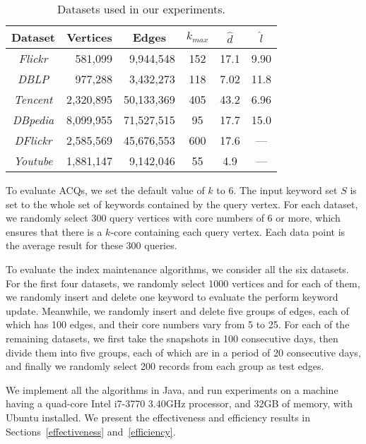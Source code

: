 \begin{table}[h]
  \centering
  \small
  \footnotesize \caption {Datasets used in our experiments.}\label{tab:dataset}
  \begin{tabular}{c|r|r|c|c|c}
     \hline
          {\bf Dataset}  & \multicolumn{1}{c|}{\textbf{Vertices}}
                         & \multicolumn{1}{c|}{\textbf{Edges}}
                         & $k_{max}$
                         & \textbf{\emph{{$\widehat d$}}}
                         & \textbf{\emph{{$\widehat l$}}}\\
     \hline\hline
          \emph{Flickr}         &  581,099      &  9,944,548   &   152   & 17.1   &  9.90 \\
     \hline
          \emph{DBLP}           &  977,288      &  3,432,273   &   118   &  7.02  &  11.8 \\
     \hline
          \emph{Tencent}        &  2,320,895    &  50,133,369  &   405   &  43.2  &  6.96 \\
     \hline
          \emph{DBpedia}        &  8,099,955    &  71,527,515  &    95   &  17.7  &  15.0 \\
     \hline
          \emph{DFlickr}        &  2,585,569    &  45,676,553  &   600   &  17.6  &  --- \\
     \hline
          \emph{Youtube}        &  1,881,147    &  9,142,046   &   55   &  4.9  &  --- \\
     \hline
  \end{tabular}
\end{table}

{\color{blue}
To evaluate ACQs, we set the default value of $k$ to 6. The input keyword set $S$ is set to the whole set of keywords contained by the query vertex. For each dataset, we randomly select 300 query vertices with core numbers of 6 or more, which ensures that there is a $k$-core containing each query vertex.
Each data point is the average result for these 300 queries.

To evaluate the index maintenance algorithms, we consider all the six datasets.
For the first four datasets, we randomly select 1000 vertices and for each of them, we randomly insert and delete one keyword to evaluate the perform keyword update. Meanwhile, we randomly insert and delete five groups of edges, each of which has 100 edges, and their core numbers vary from 5 to 25.
For each of the remaining datasets, we first take the snapshots in 100 consecutive days, then divide them into five groups, each of which are in a period of 20 consecutive days, and finally we randomly select 200 records from each group as test edges.

We implement all the algorithms in Java, and run experiments on a machine having a quad-core Intel i7-3770 3.40GHz processor, and 32GB of memory, with Ubuntu installed.
We present the effectiveness and efficiency results in Sections~\ref{effectiveness} and~\ref{efficiency}.
} 